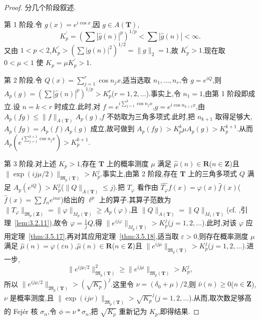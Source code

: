\begin{proof}
分几个阶段叙述.

第 1 阶段.令 $g(x)=e^{i\cos x}$,因 $g\in A(\mathbf{T})$,
\begin{equation*}
K_{p}^{\prime} = \left(\sum|\widehat{g}(n)|^{p}\right)^{1/p} < \sum|\widehat{g}(n)| < \infty.
\end{equation*}
又由 $1 < p < 2$,$K_{p}^{\prime} > \left(\sum|g(n)|^{2}\right)^{1/2} = \|g\|_{2} = 1$,故 $K_{p}^{\prime} > 1$.现在取 $0 < \mu < 1$ 使 $K_{p} = \mu K_{p}^{\prime} > 1$.

第 2 阶段.令 $Q(x) = \sum_{j=1}^{r}\cos n_{j}x$,适当选取 $n_{1}, \ldots, n_{r}$,令 $g = e^{iQ}$,则 $A_{p}(g) = \left(\sum|\widehat{g}(n)|^{p}\right)^{1/p} > K_{p}^{r}$($r = 1, 2, \ldots$).事实上,令 $n_{1} = 1$,由第 1 阶段即成立.设 $n = k < r$ 时成立.此时,对 $f = e^{i\sum_{j=1}^{k}\cos n_{j}x}$,$g = e^{i\cos n_{k+1}x}$,由 $A_{p}(fg) \leq \|f\|_{A(\mathbf{T})}A_{p}(g)$,$f$ 不妨取为三角多项式.此时,把 $n_{k+1}$ 取得足够大,$A_{p}(fg) = A_{p}(f)A_{p}(g)$ 成立,故可做到 $A_{p}(fg) > K_{p}^{k}\mu A_{p}(g) > K_{p}^{k+1}$.从而 $A_{p}\left(e^{i\sum_{j=1}^{k+1}\cos n_{j}x}\right) > K_{p}^{k+1}$.

第 3 阶段.对上述 $K_{p} > 1$,存在 $\mathbf{T}$ 上的概率测度 $\mu$ 满足 $\widehat{\mu}(n) \in \mathbf{R}$($n \in \mathbf{Z}$)且 $\|\exp(ij\mu/2)\|_{\mathfrak{M}_{p}(\mathbf{T})} > K_{p}^{j}$.事实上,由第 2 阶段,存在 $\mathbf{T}$ 上的三角多项式 $Q$ 满足 $A_{p}(e^{iQ}) > K_{p}^{j}$($\|Q\|_{A(\mathbf{T})} \leq j$).把 $T_{\varphi}$ 看作由 $\widehat{T_{\varphi}}f(x) = \varphi(x)\widehat{f}(x)$($\widehat{f}(x) = \sum f_n e^{inx}$)给出的 $\ell^p$ 上的算子.其算子范数为 $\|T_{\varphi}\|_{\mathfrak{M}_{p}(\mathbf{Z})} = \|\varphi\|_{M_p(\mathbf{T})} \geq A_p(\varphi)$,且 $\|Q\|_{A(\mathbf{T})} = \|Q\|_{M_1(\mathbf{T})}$(cf. \cite{ch3:9},引理~\ref{lem:3.2.11}),故令 $\varphi = \frac{1}{j}Q$,得 $\|e^{ij\varphi}\|_{M_p(\mathbf{T})} > K_p^j$($j = 1, 2, \ldots$).此时,对该 $\varphi$ 应用定理~\ref{thm:3.5.17},再对其应用定理~\ref{thm:3.5.18},适当取 $\varepsilon > 0$,则存在概率测度 $\mu$ 满足 $\widehat{\mu}(n) = \varphi(\varepsilon n)$,$\widehat{\mu}(n) \in \mathbf{R}$($n \in \mathbf{Z}$)且 $\|e^{ij\mu}\|_{\mathfrak{M}_{p}(\mathbf{T})} > K_p^j$($j = 1, 2, \ldots$).进一步,
\begin{equation*}
\|e^{ij\mu/2}\|_{\mathfrak{M}_{p}(\mathbf{T})}^{2} \geq \|e^{ij\mu}\|_{\mathfrak{M}_{p}(\mathbf{T})} > K_{p}^{j},
\end{equation*}
所以 $\|e^{ij\mu/2}\|_{\mathfrak{M}_{p}(\mathbf{T})} > \left(\sqrt{K_{p}}\right)^{j}$.这里令 $\nu = (\delta_{0} + \mu)/2$,则 $\widehat{\nu}(n) \geq 0$($n \in \mathbf{Z}$),$\nu$ 是概率测度,且 $\|\exp(ij\nu)\|_{\mathfrak{M}_{p}(\mathbf{T})} > \sqrt{K_{p}}^{j}$($j = 1, 2, \ldots$).从而,取次数足够高的 Fejér 核 $\sigma_{n}$,令 $\phi = \nu * \sigma_{n}$,把 $\sqrt{K_{p}}$ 重新记为 $K_{p}$,即得结果.
\end{proof}

